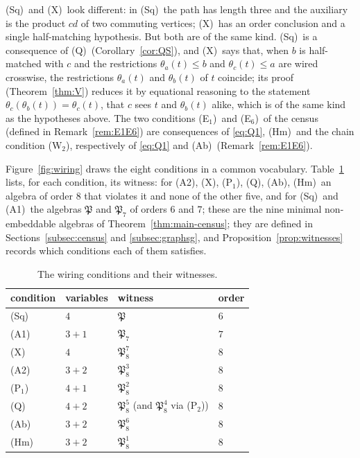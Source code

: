 \documentclass[11pt]{amsart}
\theoremstyle{definition}
\newcommand{\Wire}{\textup{(Sq)}}      %
\newcommand{\Rcond}{\textup{(A1)}}     %
\newcommand{\Rp}{\textup{(A2)}}        %
\newcommand{\Vcond}{\textup{(X)}}      %
\newcommand{\Pone}{\textup{(P$_1$)}}
\newcommand{\Ptwo}{\textup{(P$_2$)}}
\newcommand{\Qcond}{\textup{(Q)}}
\newcommand{\Eone}{\textup{(E$_1$)}}
\newcommand{\Esix}{\textup{(E$_6$)}}
\newcommand{\Kzero}{\textup{(Hm)}}     %
\newcommand{\Kfour}{\textup{(Ab)}}     %
\begin{document}
\Wire\ and \Vcond\ look different: in \Wire\ the path has length three and the auxiliary is the product $cd$ of two commuting vertices; \Vcond\ has an order conclusion and a single half-matching hypothesis. But both are of the same kind. \Wire\ is a consequence of \Qcond\ (Corollary~\ref{cor:QS}), and \Vcond\ says that, when $b$ is half-matched with $c$ and the restrictions $\theta_a(t)\le b$ and $\theta_c(t)\le a$ are wired crosswise, the restrictions $\theta_a(t)$ and $\theta_b(t)$ of $t$ coincide; its proof (Theorem~\ref{thm:V}) reduces it by equational reasoning to the statement $\theta_c(\theta_b(t))=\theta_c(t)$, that $c$ sees $t$ and $\theta_b(t)$ alike, which is of the same kind as the hypotheses above. The two conditions \Eone\ and \Esix\ of the census (defined in Remark~\ref{rem:E1E6}) are consequences of \eqref{eq:Q1}, \Kzero\ and the chain condition (W$_2$), respectively of \eqref{eq:Q1} and \Kfour\ (Remark~\ref{rem:E1E6}).

Figure~\ref{fig:wiring} draws the eight conditions in a common vocabulary. Table~\ref{tab:witnesses} lists, for each condition, its witness: for \Rp, \Vcond, \Pone, \Qcond, \Kfour, \Kzero\ an algebra of order $8$ that violates it and none of the other five, and for \Wire\ and \Rcond\ the algebras $\mathfrak P$ and $\mathfrak P_7$ of orders $6$ and $7$; these are the nine minimal non-embeddable algebras of Theorem~\ref{thm:main-census}; they are defined in Sections~\ref{subsec:census} and \ref{subsec:graphsg}, and Proposition~\ref{prop:witnesses} records which conditions each of them satisfies.



\begin{table}[htbp]
\centering\small
\begin{tabular}{@{}llll@{}}
\toprule
condition & variables & witness & order\\
\midrule
\Wire & $4$ & $\mathfrak P$ & $6$\\
\Rcond & $3+1$ & $\mathfrak P_7$ & $7$\\
\Vcond & $4$ & $\mathfrak P_8^7$ & $8$\\
\Rp & $3+2$ & $\mathfrak P_8^3$ & $8$\\
\Pone & $4+1$ & $\mathfrak P_8^2$ & $8$\\
\Qcond & $4+2$ & $\mathfrak P_8^5$ (and $\mathfrak P_8^4$ via \Ptwo) & $8$\\
\Kfour & $3+2$ & $\mathfrak P_8^6$ & $8$\\
\Kzero & $3+2$ & $\mathfrak P_8^1$ & $8$\\
\bottomrule
\end{tabular}
\caption{The wiring conditions and their witnesses.}\label{tab:witnesses}
\end{table}
\end{document}
